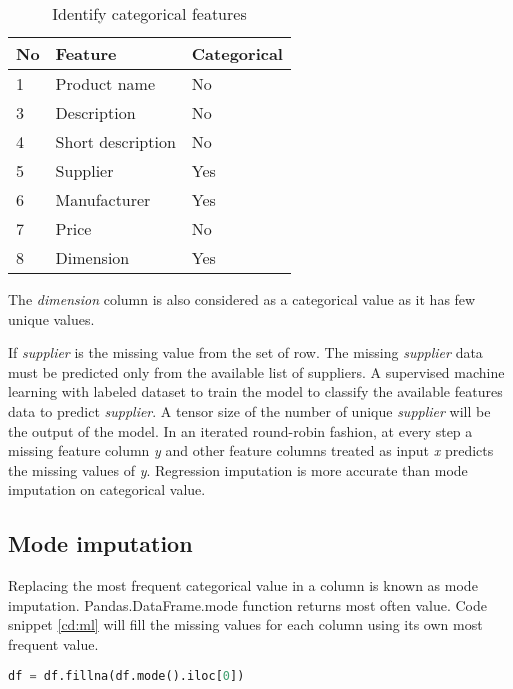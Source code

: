 \begin{table}[h]
    \centering
    \caption{Identify categorical features}
    \label{table:feature_imputation}
    \begin{tabular}{ lll }
          \toprule
          
          \textbf{No}& \textbf{Feature} & \textbf{Categorical}\\
          \midrule
          1&Product name & No\\
          3&Description & No\\         
          4&Short description  & No\\
          5&Supplier  & Yes\\
          6&Manufacturer  &  Yes\\           
          7&Price  &  No \\
          8&Dimension  & Yes\\
          \bottomrule
          \end{tabular}
\end{table}

The \textit{dimension} column is also considered as a categorical value as it has few unique values.

If \textit{supplier} is the missing value from the set of row. The missing \textit{supplier} data must be predicted only from the available list of suppliers. A supervised machine learning with labeled dataset to train the model to classify the available features data to predict \textit{supplier}. A tensor size of the number of unique \textit{supplier} will be the output of the model. 
In an iterated round-robin fashion, at every step a missing feature column  \textit{y} and other feature columns treated as input \textit{x} predicts the missing values of \textit{y}. Regression imputation is more accurate than mode imputation on categorical value.


\subsection{Mode imputation}

Replacing the most frequent categorical value in a column is known as mode imputation.  Pandas.DataFrame.mode \parencite{mckinney-proc-scipy-2010} function returns most often value. Code snippet \ref{cd:ml} will fill the missing values for each column using its own most frequent value.

\begin{lstlisting}[language=Python, caption={Pandas DataFrames mode function},label={cd:ml}]
    df = df.fillna(df.mode().iloc[0])
\end{lstlisting}

